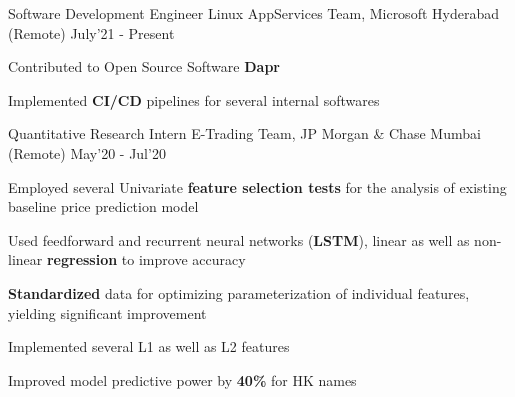 \begin{cventries}

  \cventry
  {Software Development Engineer}
  {Linux AppServices Team, Microsoft}
  {Hyderabad (Remote)}
  {July'21 - Present}
  {
    \begin{cvitems}
      \item Contributed to Open Source Software \textbf{Dapr} 
      \item Implemented \textbf{CI/CD} pipelines for several internal softwares
    \end{cvitems}
  }
  \cventry
  {Quantitative Research Intern}
  {E-Trading Team, JP Morgan \& Chase}
  {Mumbai (Remote)}
  {May'20 - Jul'20}
  {
    \begin{cvitems}
      \item Employed several Univariate \textbf{feature selection tests} for the analysis of existing baseline price prediction model
      \item Used feedforward and recurrent neural networks (\textbf{LSTM}), linear as well as non-linear \textbf{regression} to improve accuracy
      \item	\textbf{Standardized} data for optimizing parameterization of individual features, yielding significant improvement
      \item Implemented several L1 as well as L2 features
      \item Improved model predictive power by \textbf{40\%} for HK names
    \end{cvitems}
  }

\end{cventries}
\vspace{-2mm}

